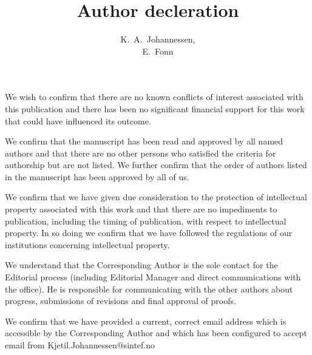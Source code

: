 \documentclass[preprint,12pt, a4paper]{elsarticle}
\begin{document}
\title{Author decleration}

\author{K.~A.~Johannessen, \\
        E.~Fonn}

\maketitle

We  wish  to  confirm  that  there  are  no  known  conflicts  of  interest associated  with  this publication and  there  has been no significant financial support for this  work that could have influenced its outcome.

\vspace{1cm}

We  confirm  that  the  manuscript  has  been  read  and  approved  by  all  named  authors  and  that there  are  no  other  persons  who  satisfied  the  criteria  for  authorship  but  are  not  listed. We further confirm that the order of authors listed in the manuscript has been approved by all of us.

\vspace{1cm}

We  confirm  that  we  have  given  due  consideration  to  the  protection  of  intellectual  property associated  with  this  work  and  that  there  are  no  impediments  to  publication,  including  the timing  of  publication,  with  respect  to intellectual  property. In  so  doing  we  confirm  that  we have followed the regulations of our institutions concerning intellectual property.

\vspace{1cm}

We  understand  that  the  Corresponding  Author  is  the  sole  contact  for  the  Editorial  process (including   Editorial   Manager   and   direct   communications   with   the   office).     He  is responsible  for  communicating  with  the  other  authors  about  progress,  submissions  of revisions and final approval of proofs.

\vspace{1cm}

We confirm that we have provided a current, correct email  address  which  is  accessible  by  the  Corresponding  Author  and  which  has  been configured  to  accept  email  from Kjetil.Johannessen@sintef.no
\end{document}
